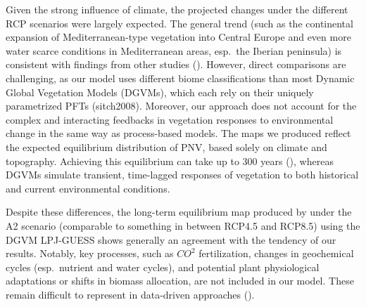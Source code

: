 \documentclass[
]{krantz}
\begin{document}
Given the strong influence of climate, the projected changes under the different RCP scenarios were largely expected. The general trend (such as the continental expansion of Mediterranean-type vegetation into Central Europe and even more water scarce conditions in Mediterranean areas, esp.~the Iberian peninsula) is consistent with findings from other studies (\citet{hickler2012}). However, direct comparisons are challenging, as our model uses different biome classifications than most Dynamic Global Vegetation Models (DGVMs), which each rely on their uniquely parametrized PFTs (sitch2008). Moreover, our approach does not account for the complex and interacting feedbacks in vegetation responses to environmental change in the same way as process-based models. The maps we produced reflect the expected equilibrium distribution of PNV, based solely on climate and topography. Achieving this equilibrium can take up to 300 years (\citet{hickler2012}), whereas DGVMs simulate transient, time-lagged responses of vegetation to both historical and current environmental conditions.

Despite these differences, the long-term equilibrium map produced by \citet{hickler2012} under the A2 scenario (comparable to something in between RCP4.5 and RCP8.5) using the DGVM LPJ-GUESS shows generally an agreement with the tendency of our results. Notably, key processes, such as \(CO^2\) fertilization, changes in geochemical cycles (esp.~nutrient and water cycles), and potential plant physiological adaptations or shifts in biomass allocation, are not included in our model. These remain difficult to represent in data-driven approaches (\citet{bonannella2023}).
\end{document}

